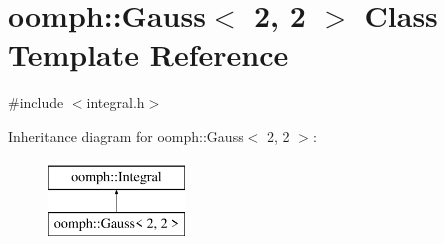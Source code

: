 \hypertarget{classoomph_1_1Gauss_3_012_00_012_01_4}{}\section{oomph\+:\+:Gauss$<$ 2, 2 $>$ Class Template Reference}
\label{classoomph_1_1Gauss_3_012_00_012_01_4}


{\ttfamily \#include $<$integral.\+h$>$}

Inheritance diagram for oomph\+:\+:Gauss$<$ 2, 2 $>$\+:\begin{figure}[H]
\begin{center}
\leavevmode
\includegraphics[height=2.000000cm]{classoomph_1_1Gauss_3_012_00_012_01_4}
\end{center}
\end{figure}
